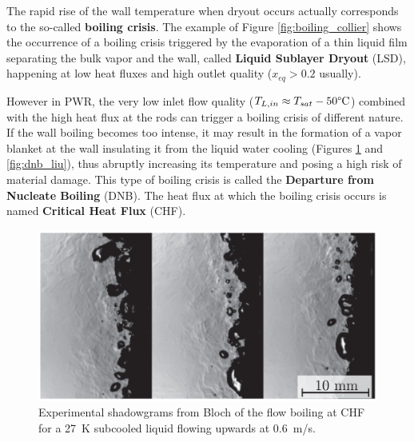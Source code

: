 The rapid rise of the wall temperature when dryout occurs actually corresponds to the so-called \textbf{boiling crisis}. The example of Figure \ref{fig:boiling_collier} shows the occurrence of a boiling crisis triggered by the evaporation of a thin liquid film separating the bulk vapor and the wall, called \textbf{Liquid Sublayer Dryout} (LSD), happening at low heat fluxes and high outlet quality ($x_{eq} >0.2$ usually). 

\npar

However in PWR, the very low inlet flow quality ($T_{L,in}\approx T_{sat}-50\degree\mathrm{C}$) combined with the high heat flux at the rods can trigger a boiling crisis of different nature. If the wall boiling becomes too intense, it may result in the formation of a vapor blanket at the wall insulating it from the liquid water cooling (Figures \ref{fig:dnb_bloch} and \ref{fig:dnb_liu}), thus abruptly increasing its temperature and posing a high risk of material damage. This type of boiling crisis is called the \textbf{Departure from Nucleate Boiling} (DNB). The heat flux at which the boiling crisis occurs is named \textbf{Critical Heat Flux} (CHF).


\begin{figure}[!h]
\centering
\includegraphics[width=0.5\linewidth]{img/intro/dnb_bloch.png}
\caption{Experimental shadowgrams from Bloch \etal \cite{bloch_phenomenological_2013} of the flow boiling at CHF for a 27\ K subcooled liquid flowing upwards at 0.6\ m/s.}
\label{fig:dnb_bloch}
\end{figure}

